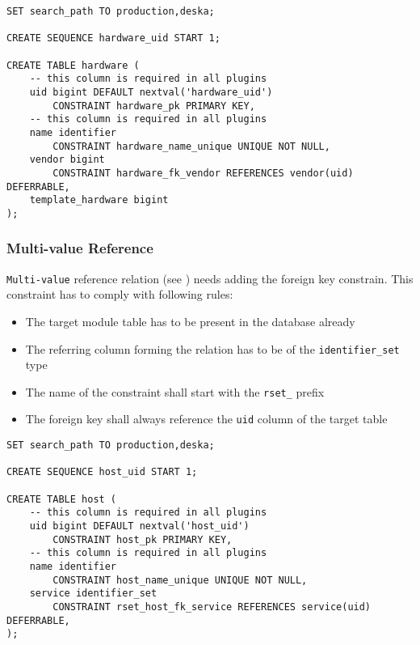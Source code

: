 \documentclass[deska]{subfiles}
\begin{document}
\begin{verbatim}
SET search_path TO production,deska;

CREATE SEQUENCE hardware_uid START 1;

CREATE TABLE hardware (
    -- this column is required in all plugins
    uid bigint DEFAULT nextval('hardware_uid')
        CONSTRAINT hardware_pk PRIMARY KEY,
    -- this column is required in all plugins
    name identifier
        CONSTRAINT hardware_name_unique UNIQUE NOT NULL,
    vendor bigint 
        CONSTRAINT hardware_fk_vendor REFERENCES vendor(uid) DEFERRABLE,
    template_hardware bigint
);
\end{verbatim}


\subsubsection{Multi-value Reference}
{\tt Multi-value} reference relation (see ) needs adding the foreign key constrain. This constraint has to comply with following rules:
\begin{itemize}
    \item The target module table has to be present in the database already
    \item The referring column forming the relation has to be of the {\tt identifier\_set} type
    \item The name of the constraint shall start with the {\tt rset\_} prefix
    \item The foreign key shall always reference the {\tt uid} column of the target table
\end{itemize}

\begin{verbatim}
SET search_path TO production,deska;

CREATE SEQUENCE host_uid START 1;

CREATE TABLE host (
    -- this column is required in all plugins
    uid bigint DEFAULT nextval('host_uid')
        CONSTRAINT host_pk PRIMARY KEY,
    -- this column is required in all plugins
    name identifier
        CONSTRAINT host_name_unique UNIQUE NOT NULL,
    service identifier_set
        CONSTRAINT rset_host_fk_service REFERENCES service(uid) DEFERRABLE,
);
\end{verbatim}
\end{document}
